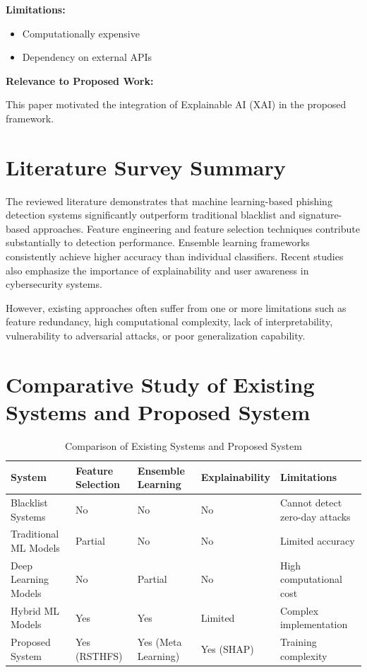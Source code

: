 \documentclass[12pt]{report}
\begin{document}
\textbf{Limitations:}
\begin{itemize}
    \item Computationally expensive
    \item Dependency on external APIs
\end{itemize}

\textbf{Relevance to Proposed Work:}

This paper motivated the integration of Explainable AI (XAI) in the proposed framework.

\section{Literature Survey Summary}

The reviewed literature demonstrates that machine learning-based phishing detection systems significantly outperform traditional blacklist and signature-based approaches. Feature engineering and feature selection techniques contribute substantially to detection performance. Ensemble learning frameworks consistently achieve higher accuracy than individual classifiers. Recent studies also emphasize the importance of explainability and user awareness in cybersecurity systems.

However, existing approaches often suffer from one or more limitations such as feature redundancy, high computational complexity, lack of interpretability, vulnerability to adversarial attacks, or poor generalization capability.

\section{Comparative Study of Existing Systems and Proposed System}

\begin{table}[H]
\centering
\caption{Comparison of Existing Systems and Proposed System}
\begin{tabular}{|p{3cm}|p{2cm}|p{2cm}|p{2.5cm}|p{3cm}|}
\hline
\textbf{System} & \textbf{Feature Selection} & \textbf{Ensemble Learning} & \textbf{Explainability} & \textbf{Limitations} \\
\hline
Blacklist Systems & No & No & No & Cannot detect zero-day attacks \\
\hline
Traditional ML Models & Partial & No & No & Limited accuracy \\
\hline
Deep Learning Models & No & Partial & No & High computational cost \\
\hline
Hybrid ML Models & Yes & Yes & Limited & Complex implementation \\
\hline
Proposed System & Yes (RSTHFS) & Yes (Meta Learning) & Yes (SHAP) & Training complexity \\
\hline
\end{tabular}
\end{table}
\end{document}
